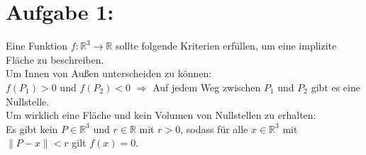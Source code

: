 \section*{Aufgabe 1: }

Eine Funktion $f : \mathbb{R}^3 \to \mathbb{R}$ sollte folgende Kriterien erfüllen, um eine implizite Fläche zu beschreiben.\\

Um Innen von Außen unterscheiden zu können: \\
$f(P_1) > 0$ und $f(P_2) < 0$ \hspace{5pt} $\Rightarrow$ \hspace{5pt} Auf jedem Weg zwischen $P_1$ und $P_2$ gibt es eine Nullstelle.\\

Um wirklich eine Fläche und kein Volumen von Nullstellen zu erhalten:\\
Es gibt kein $P \in \mathbb{R}^3$ und $r \in \mathbb{R}$ mit $r > 0$, sodass für alle $x \in \mathbb{R}^3$ mit $\lVert P - x \rVert < r$ gilt $f(x) = 0$.

